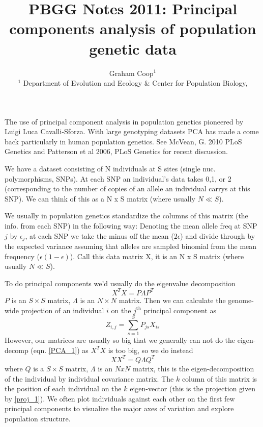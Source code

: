 \documentclass{article}
\begin{document}
\title{PBGG Notes 2011: Principal components analysis of population genetic data}
\author{Graham Coop$^{1}$ \\
\small $^1$ Department of Evolution and Ecology \& Center for Population Biology,\\
}
\date{}
\maketitle

The use of principal component analysis in population genetics pioneered by
Luigi Luca Cavalli-Sforza. With large genotyping datasets PCA has made
a come back particularly in human population genetics. See McVean, G. 2010
PLoS Genetics and Patterson et al 2006, PLoS Genetics for recent discussion.
 

We have a dataset consisting of N individuals at S sites (single nuc. polymorphisms, SNPs). At each SNP an individual's data takes 0,1, or 2 (corresponding to the number of copies of an allele an individual carrys at this SNP). We can think of this as a N x S matrix (where usually $N \ll S$).

We usually in population genetics standardize the columns of this
matrix (the info. from each SNP) in the following way:  Denoting the mean allele freq at SNP $j$ by $\epsilon_j$, at each SNP we take the minus off the mean ($2\epsilon$) and divide through by the expected variance assuming that alleles are sampled binomial from the mean frequency ($\epsilon (1-\epsilon)$). Call this data matrix X, it is an N x S matrix (where usually $N \ll S$).

To do principal components we'd usually do the eigenvalue decomposition
\begin{equation}
X^TX = P \Lambda P^T \label{PCA_1}
\end{equation}
$P$ is an $S \times S$ matrix, $\Lambda$ is an $N\times N$ matrix. Then we can calculate the genome-wide projection of an individual $i$ on the $j^\mathrm{th}$ principal component as
\begin{equation}
Z_{i,j} = \sum_{s=1}^S P_{j s}X_{is} \label{proj_1}
\end{equation}
However, our matrices are usually so big that we generally can not do the eigen-decomp (eqn. \ref{PCA_1}) as $X^TX$ is too big, so we do instead
\begin{equation}
XX^T = Q \Lambda Q^T \label{PCA_2}
\end{equation}
where $Q$ is a $S \times S$ matrix, $\Lambda$ is an $NxN$ matrix, this is the
eigen-decomposition of the individual by individual covariance
matrix. The $k$ column of this matrix is the position of each
individual on the $k$ eigen-vector (this is the projection given by \ref{proj_1}). We often plot individuals against
each other on the first few principal components to visualize the
major axes of variation and explore population structure.
\end{document}

